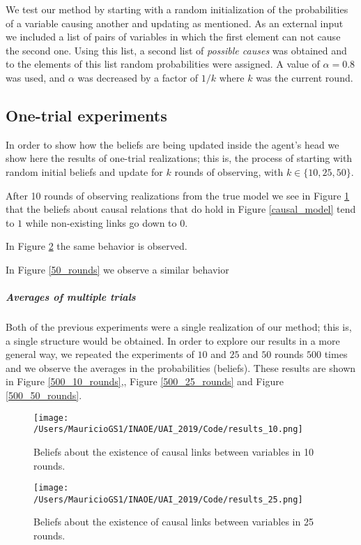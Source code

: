 \documentclass[letterpaper]{article}
\begin{document}
We test our method by starting with a random initialization of the probabilities of a variable causing another and updating as mentioned. As an external input we included a list of pairs of variables in which the first element can not cause the second one. Using this list, a second list of \textit{possible causes} was obtained and to the elements of this list random probabilities were assigned. A value of $\alpha=0.8$ was used, and $\alpha$ was decreased by a factor of $1/k$ where $k$ was the current round. 

\subsection{One-trial experiments}
In order to show how the beliefs are being updated inside the agent's head we show here the results of one-trial realizations; this is, the process of starting with random initial beliefs and update for $k$ rounds of observing, with $k \in \{ 10,25,50 \}$. 

After 10 rounds of observing realizations from the true model we see in Figure \ref{10_rounds} that the beliefs about causal relations that do hold in Figure \ref{causal_model} tend to $1$ while non-existing links go down to $0$. 

In Figure \ref{25_rounds} the same behavior is observed.

In Figure \ref{50_rounds} we observe a similar behavior

\subparagraph{Averages of multiple trials}
Both of the previous experiments were a single realization of our method; this is, a single structure would be obtained. In order to explore our results in a more general way, we repeated the experiments of $10$ and $25$ and $50$ rounds $500$ times and we observe the averages in the probabilities (beliefs). These results are shown in Figure \ref{500_10_rounds},, Figure \ref{500_25_rounds} and Figure \ref{500_50_rounds}.

\begin{figure}[ht]
\vskip 0.2in
\begin{center}
\centerline{\texttt{[image: /Users/MauricioGS1/INAOE/UAI\_2019/Code/results\_10.png]}}
\caption{Beliefs about the existence of causal links between variables in 10 rounds.}
\label{10_rounds}
\end{center}
\vskip -0.2in
\end{figure}

\begin{figure}[ht]
\vskip 0.2in
\begin{center}
\centerline{\texttt{[image: /Users/MauricioGS1/INAOE/UAI\_2019/Code/results\_25.png]}}
\caption{Beliefs about the existence of causal links between variables in 25 rounds.}
\label{25_rounds}
\end{center}
\vskip -0.2in
\end{figure}
\end{document}
